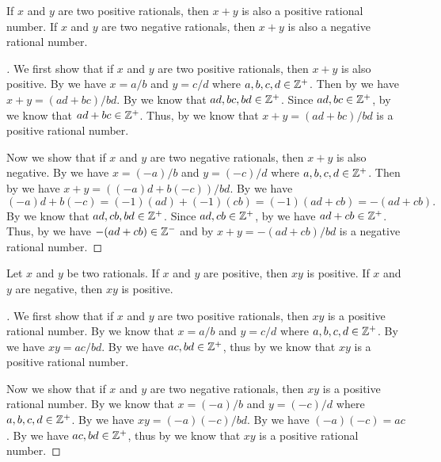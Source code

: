 \begin{ac}\label{i:ac:4.2.6}
  If \(x\) and \(y\) are two positive rationals, then \(x + y\) is also a positive rational number.
  If \(x\) and \(y\) are two negative rationals, then \(x + y\) is also a negative rational number.
\end{ac}

\begin{proof}[]
  We first show that if \(x\) and \(y\) are two positive rationals, then \(x + y\) is also positive.
  By  we have \(x = a / b\) and \(y = c / d\) where \(a, b, c, d \in \mathbb{Z}^+\).
  Then by  we have \(x + y = (ad + bc) / bd\).
  By  we know that \(ad, bc, bd \in \mathbb{Z}^+\).
  Since \(ad, bc \in \mathbb{Z}^+\), by  we know that \(ad + bc \in \mathbb{Z}^+\).
  Thus, by  we know that \(x + y = (ad + bc) / bd\) is a positive rational number.

  Now we show that if \(x\) and \(y\) are two negative rationals, then \(x + y\) is also negative.
  By  we have \(x = (-a) / b\) and \(y = (-c) / d\) where \(a, b, c, d \in \mathbb{Z}^+\).
  Then by  we have \(x + y = ((-a)d + b(-c)) / bd\).
  By  we have
  \[
    (-a)d + b(-c) = (-1) (ad) + (-1) (cb) = (-1)(ad + cb) = -(ad + cb).
  \]
  By  we know that \(ad, cb, bd \in \mathbb{Z}^+\).
  Since \(ad, cb \in \mathbb{Z}^+\), by  we have \(ad + cb \in \mathbb{Z}^+\).
  Thus, by  we have \(-(ad + cb) \in \mathbb{Z}^-\) and by  \(x + y = -(ad + cb) / bd\) is a negative rational number.
\end{proof}

\begin{ac}\label{i:ac:4.2.7}
  Let \(x\) and \(y\) be two rationals.
  If \(x\) and \(y\) are positive, then \(xy\) is positive.
  If \(x\) and \(y\) are negative, then \(xy\) is positive.
\end{ac}

\begin{proof}[]
  We first show that if \(x\) and \(y\) are two positive rationals, then \(xy\) is a positive rational number.
  By  we know that \(x = a / b\) and \(y = c / d\) where \(a, b, c, d \in \mathbb{Z}^+\).
  By  we have \(xy = ac / bd\).
  By  we have \(ac, bd \in \mathbb{Z}^+\), thus by  we know that \(xy\) is a positive rational number.

  Now we show that if \(x\) and \(y\) are two negative rationals, then \(xy\) is a positive rational number.
  By  we know that \(x = (-a) / b\) and \(y = (-c) / d\) where \(a, b, c, d \in \mathbb{Z}^+\).
  By  we have \(xy = (-a)(-c) / bd\).
  By  we have \((-a)(-c) = ac\).
  By  we have \(ac, bd \in \mathbb{Z}^+\), thus by  we know that \(xy\) is a positive rational number.
\end{proof}

